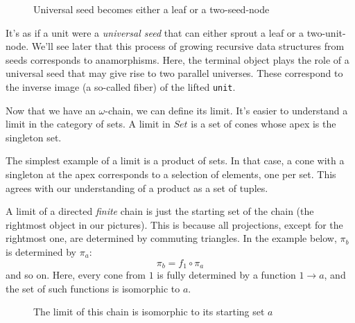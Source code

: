 \documentclass[11pt]{amsart}
\newcommand{\hask}[1]{\texttt{#1}}
\begin{document}
\begin{figure}[H]
\caption{Universal seed becomes either a leaf or a two-seed-node}
\end{figure}



It's as if a unit were a \emph{universal seed} that can either sprout a leaf or a two-unit-node. We'll see later that this process of growing recursive data structures from seeds corresponds to anamorphisms. Here, the terminal object plays the role of a universal seed that may give rise to two parallel universes. These correspond to the inverse image (a so-called fiber) of the lifted \hask{unit}.

Now that we have an $\omega$-chain, we can define its limit. It's easier to understand a limit in the category of sets. A limit in $Set$ is a set of cones whose apex is the singleton set. 

The simplest example of a limit is a product of sets. In that case, a cone with a singleton at the apex corresponds to a selection of elements, one per set. This agrees with our understanding of a product as a set of tuples. 

A limit of a directed \emph{finite} chain is just the starting set of the chain (the rightmost object in our pictures). This is because all projections, except for the rightmost one, are determined by commuting triangles. In the example below, $\pi_b$ is determined by $\pi_a$:
\[\pi_b = f_1 \circ \pi_a\]
and so on. Here, every cone from $1$ is fully determined by a function $1 \to a$, and the set of such functions is isomorphic to $a$.
\begin{figure}[H]
\centering
{}
\caption{The limit of this chain is isomorphic to its starting set $a$}
\end{figure}
\end{document}
